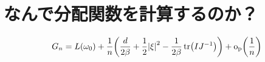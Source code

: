 \documentclass[dvipdfmx]{jsarticle}
\begin{document}
\section{なんで分配関数を計算するのか？}

\begin{mybox}
\begin{equation}
    G_n = L(\omega_0) + \frac{1}{n}\qty(\frac{d}{2\beta} + \frac{1}{2}\abs{\xi}^2 - \frac{1}{2\beta}\tr(IJ^{-1})) + \mathrm{o_p}\qty(\frac{1}{n})
\end{equation}    
\end{mybox}
\end{document}
